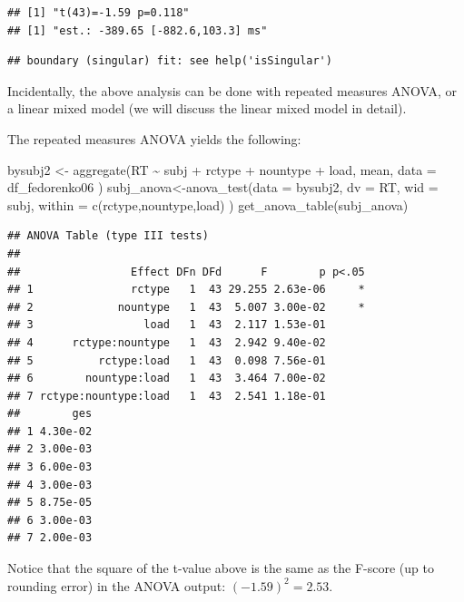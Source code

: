 \documentclass[
  12pt,
]{krantz}
\newenvironment{Shaded}{\begin{snugshade}}{\end{snugshade}}
\newcommand{\AttributeTok}[1]{\textcolor[rgb]{0.77,0.63,0.00}{#1}}
\newcommand{\FunctionTok}[1]{\textcolor[rgb]{0.00,0.00,0.00}{#1}}
\newcommand{\NormalTok}[1]{#1}
\newcommand{\OtherTok}[1]{\textcolor[rgb]{0.56,0.35,0.01}{#1}}
\newcommand{\SpecialCharTok}[1]{\textcolor[rgb]{0.00,0.00,0.00}{#1}}
\theoremstyle{definition}
\theoremstyle{definition}
\theoremstyle{definition}
\theoremstyle{definition}
\theoremstyle{remark}
\begin{document}
\begin{verbatim}
## [1] "t(43)=-1.59 p=0.118"
## [1] "est.: -389.65 [-882.6,103.3] ms"
\end{verbatim}

\begin{verbatim}
## boundary (singular) fit: see help('isSingular')
\end{verbatim}

Incidentally, the above analysis can be done with repeated measures ANOVA, or a linear mixed model (we will discuss the linear mixed model in detail).

The repeated measures ANOVA yields the following:

\begin{Shaded}
\begin{Highlighting}[]
\NormalTok{bysubj2 }\OtherTok{\textless{}{-}} \FunctionTok{aggregate}\NormalTok{(RT }\SpecialCharTok{\textasciitilde{}}\NormalTok{ subj }\SpecialCharTok{+}\NormalTok{ rctype }\SpecialCharTok{+}\NormalTok{ nountype }\SpecialCharTok{+}\NormalTok{ load,}
\NormalTok{  mean,}
  \AttributeTok{data =}\NormalTok{ df\_fedorenko06}
\NormalTok{)}
\NormalTok{subj\_anova}\OtherTok{\textless{}{-}}\FunctionTok{anova\_test}\NormalTok{(}\AttributeTok{data =}\NormalTok{ bysubj2, }
           \AttributeTok{dv =}\NormalTok{ RT, }
           \AttributeTok{wid =}\NormalTok{ subj,}
           \AttributeTok{within =} \FunctionTok{c}\NormalTok{(rctype,nountype,load)}
\NormalTok{  )}
\FunctionTok{get\_anova\_table}\NormalTok{(subj\_anova)}
\end{Highlighting}
\end{Shaded}

\begin{verbatim}
## ANOVA Table (type III tests)
## 
##                 Effect DFn DFd      F        p p<.05
## 1               rctype   1  43 29.255 2.63e-06     *
## 2             nountype   1  43  5.007 3.00e-02     *
## 3                 load   1  43  2.117 1.53e-01      
## 4      rctype:nountype   1  43  2.942 9.40e-02      
## 5          rctype:load   1  43  0.098 7.56e-01      
## 6        nountype:load   1  43  3.464 7.00e-02      
## 7 rctype:nountype:load   1  43  2.541 1.18e-01      
##        ges
## 1 4.30e-02
## 2 3.00e-03
## 3 6.00e-03
## 4 3.00e-03
## 5 8.75e-05
## 6 3.00e-03
## 7 2.00e-03
\end{verbatim}

Notice that the square of the t-value above is the same as the F-score (up to rounding error) in the ANOVA output: \((-1.59)^2 = 2.53\).
\end{document}
